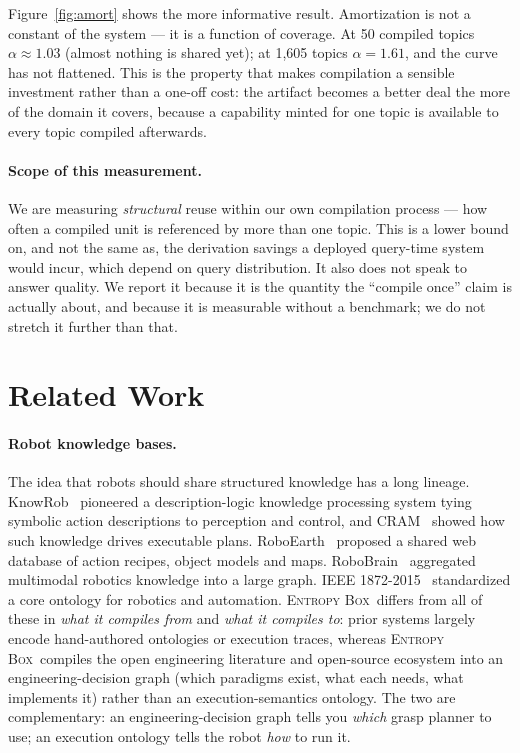 \documentclass[10pt,a4paper]{article}
\newcommand{\eb}{\textsc{Entropy Box}\xspace}
\begin{document}
Figure~\ref{fig:amort} shows the more informative result. Amortization is not a
constant of the system --- it is a function of coverage. At 50 compiled topics
$\alpha \approx 1.03$ (almost nothing is shared yet); at 1{,}605 topics
$\alpha = 1.61$, and the curve has not flattened. This is the property that makes
compilation a sensible investment rather than a one-off cost: the artifact
becomes a better deal the more of the domain it covers, because a capability
minted for one topic is available to every topic compiled afterwards.

\paragraph{Scope of this measurement.} We are measuring \emph{structural} reuse
within our own compilation process --- how often a compiled unit is referenced by
more than one topic. This is a lower bound on, and not the same as, the
derivation savings a deployed query-time system would incur, which depend on
query distribution. It also does not speak to answer quality. We report it
because it is the quantity the ``compile once'' claim is actually about, and
because it is measurable without a benchmark; we do not stretch it further than
that.

\section{Related Work}
\label{sec:related}

\paragraph{Robot knowledge bases.}
The idea that robots should share structured knowledge has a long lineage.
KnowRob~\cite{tenorth2013knowrob} pioneered a description-logic knowledge
processing system tying symbolic action descriptions to perception and control,
and CRAM~\cite{beetz2010cram} showed how such knowledge drives executable plans.
RoboEarth~\cite{waibel2011roboearth} proposed a shared web database of action
recipes, object models and maps. RoboBrain~\cite{saxena2014robobrain} aggregated
multimodal robotics knowledge into a large graph. IEEE
1872-2015~\cite{ieee1872} standardized a core ontology for robotics and
automation. \eb\ differs from all of these in \emph{what it compiles from} and
\emph{what it compiles to}: prior systems largely encode hand-authored ontologies
or execution traces, whereas \eb\ compiles the open engineering literature and
open-source ecosystem into an engineering-decision graph (which paradigms exist,
what each needs, what implements it) rather than an execution-semantics ontology.
The two are complementary: an engineering-decision graph tells you \emph{which}
grasp planner to use; an execution ontology tells the robot \emph{how} to run it.
\end{document}
